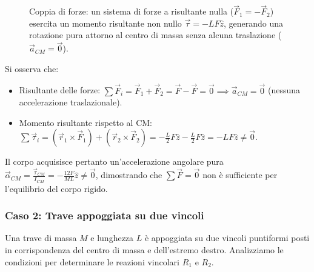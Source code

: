 \begin{figure}[ht]
\centering
{}
\caption{Coppia di forze: un sistema di forze a risultante nulla ($\vec{F}_1 = -\vec{F}_2$) esercita un momento risultante non nullo $\vec{\tau} = -LF\hat{z}$, generando una rotazione pura attorno al centro di massa senza alcuna traslazione ($\vec{a}_{CM} = \vec{0}$).}
\end{figure}

Si osserva che:
\begin{itemize}
    \item Risultante delle forze: $\sum \vec{F}_i = \vec{F}_1 + \vec{F}_2 = \vec{F} - \vec{F} = \vec{0} \implies \vec{a}_{CM} = \vec{0}$ (nessuna accelerazione traslazionale).
    \item Momento risultante rispetto al CM: $\sum \vec{\tau}_i = (\vec{r}_1 \times \vec{F}_1) + (\vec{r}_2 \times \vec{F}_2) = -\frac{L}{2} F \hat{z} - \frac{L}{2} F \hat{z} = -LF \hat{z} \neq \vec{0}$.
\end{itemize}
Il corpo acquisisce pertanto un'accelerazione angolare pura $\vec{\alpha}_{CM} = \frac{\vec{\tau}_{CM}}{I_{CM}} = -\frac{12 F}{ML} \hat{z} \neq \vec{0}$, dimostrando che $\sum \vec{F} = \vec{0}$ non è sufficiente per l'equilibrio del corpo rigido.

\subsubsection{Caso 2: Trave appoggiata su due vincoli}
Una trave di massa $M$ e lunghezza $L$ è appoggiata su due vincoli puntiformi posti in corrispondenza del centro di massa e dell'estremo destro. Analizziamo le condizioni per determinare le reazioni vincolari $R_1$ e $R_2$.

